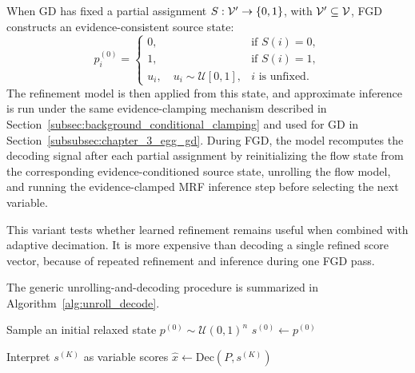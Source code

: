 When GD has fixed a partial assignment \(S:\mathcal{V}' \to \{0,1\}\), with \(\mathcal{V}' \subseteq \mathcal{V}\), FGD constructs an evidence-consistent source state:
\begin{equation}
    p^{(0)}_i =
    \begin{cases}
        0, & \text{if } S(i)=0,\\
        1, & \text{if } S(i)=1,\\
        u_i,\quad u_i \sim \mathcal{U}[0,1], & i \text{ is unfixed}.
    \end{cases}
    \label{eq:evidence_conditioned_source_state}
\end{equation}
The refinement model is then applied from this state, and approximate inference is run under the same evidence-clamping mechanism described in Section~\ref{subsec:background_conditional_clamping} and used for GD in Section~\ref{subsubsec:chapter_3_egg_gd}. During FGD, the model recomputes the decoding signal after each partial assignment by reinitializing the flow state from the corresponding evidence-conditioned source state, unrolling the flow model, and running the evidence-clamped MRF inference step before selecting the next variable.

This variant tests whether learned refinement remains useful when combined with adaptive decimation. It is more expensive than decoding a single refined score vector, because of repeated refinement and inference during one FGD pass.

The generic unrolling-and-decoding procedure is summarized in Algorithm~\ref{alg:unroll_decode}.

\begin{algorithm}[t]
\caption{Unrolling and feasibility-preserving decoding}
\label{alg:unroll_decode}
\DontPrintSemicolon


Sample an initial relaxed state $p^{(0)} \sim \mathcal{U}(0,1)^n$\;
$s^{(0)} \leftarrow p^{(0)}$\;


Interpret $s^{(K)}$ as variable scores\;
$\hat{x} \leftarrow \mathrm{Dec}(P,s^{(K)})$\;

\;

\end{algorithm}

